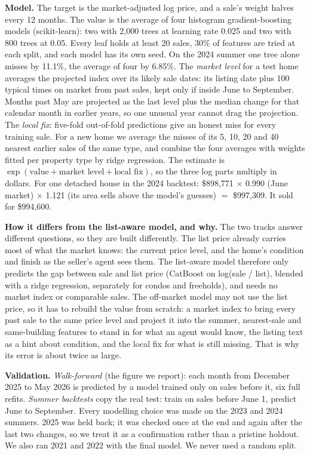 \textbf{Model.} The target is the market-adjusted log price, and a sale's weight halves every 12 months.
The value is the average of four histogram gradient-boosting models (scikit-learn): two with 2,000 trees at
learning rate 0.025 and two with 800 trees at 0.05. Every leaf holds at least 20 sales, 30\% of features
are tried at each split, and each model has its own seed. On the 2024 summer one tree alone misses by 11.1\%,
the average of four by 6.85\%.
The \emph{market level} for a test home averages the projected index over its likely sale dates: its
listing date plus 100 typical times on market from past sales, kept only if inside June to September.
Months past May are projected as the last level plus the median change for that calendar month in earlier
years, so one unusual year cannot drag the projection.
The \emph{local fix}: five-fold out-of-fold predictions give an honest miss for every training sale. For
a new home we average the misses of its 5, 10, 20 and 40 nearest earlier sales of the same type, and
combine the four averages with weights fitted per property type by ridge regression.
The estimate is $\exp(\textrm{value} + \textrm{market level} + \textrm{local fix})$, so the three log
parts multiply in dollars. For one detached house in the 2024 backtest: \$898,771 $\times$ 0.990 (June
market) $\times$ 1.121 (its area sells above the model's guesses) $=$ \$997,309. It sold for \$994,600.

\textbf{How it differs from the list-aware model, and why.} The two tracks answer different questions,
so they are built differently. The list price already carries most of what the market knows: the current
price level, and the home's condition and finish as the seller's agent sees them. The list-aware model
therefore only predicts the gap between sale and list price (CatBoost on log(sale / list), blended with a
ridge regression, separately for condos and freeholds), and needs no market index or comparable sales.
The off-market model may not use the list price, so it has to rebuild the value from scratch: a market
index to bring every past sale to the same price level and project it into the summer, nearest-sale and
same-building features to stand in for what an agent would know, the listing text as a hint about
condition, and the local fix for what is still missing. That is why its error is about twice as large.

\textbf{Validation.} \emph{Walk-forward} (the figure we report): each month from December 2025 to May 2026
is predicted by a model trained only on sales before it, six full refits. \emph{Summer backtests} copy the
real test: train on sales before June 1, predict June to September. Every modelling choice was made on the
2023 and 2024 summers. 2025 was held back; it was checked once at the end and again after the last two
changes, so we treat it as a confirmation rather than a pristine holdout. We also ran 2021 and 2022 with the
final model. We never used a random split.

